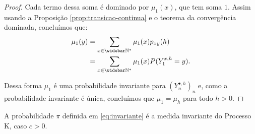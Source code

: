 \begin{proof}
  Cada termo dessa soma é dominado por $\mu_1(x)$, que tem soma $1$.
  Assim usando a Proposição \ref{prop:transicao-continua} e o teorema da
  convergência dominada, concluímos que:
  \begin{align*}
    \mu_1 (y) &= \sum_{x \in \Nzb} \mu_1(x) p_{x y} (h)\\
    &= \sum_{x \in \Nzb} \mu_1(x) P(Y_1^{x, h} = y).
  \end{align*}

  Dessa forma $\mu_1$ é uma probabilidade invariante para
  $(Y_n^{\bullet, h})_n $ e, como a probabilidade invariante é única,
  concluímos que $\mu_1 = \mu_h$ para todo $h > 0$.
\end{proof}


\begin{proposicao}
  A probabilidade $\pi$ definida em \eqref{eq:invariante} é a medida
  invariante do Processo K, caso $c > 0$.
\end{proposicao}
